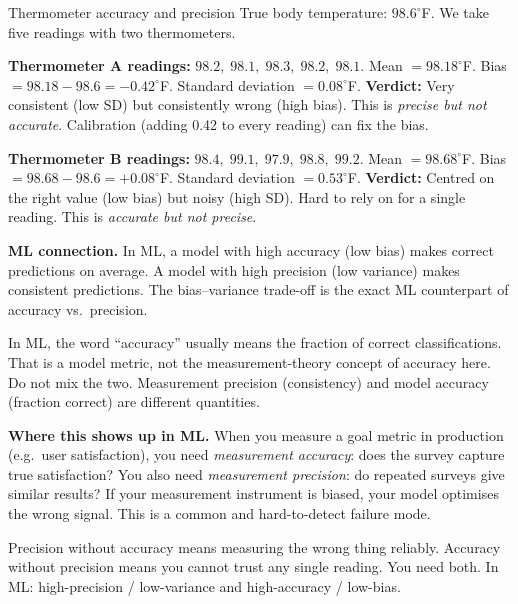 \documentclass[a4paper,11pt]{article}
\begin{document}
\begin{worked}{Thermometer accuracy and precision}
True body temperature: $98.6^{\circ}$F.
We take five readings with two thermometers.
\begin{steps}
  \item \textbf{Thermometer A readings:} $98.2,\; 98.1,\; 98.3,\; 98.2,\; 98.1$.
        Mean $= 98.18^{\circ}$F. Bias $= 98.18 - 98.6 = -0.42^{\circ}$F.
        Standard deviation $= 0.08^{\circ}$F.
        \textbf{Verdict:} Very consistent (low SD) but consistently wrong (high bias).
        This is \emph{precise but not accurate}.
        Calibration (adding 0.42 to every reading) can fix the bias.
  \item \textbf{Thermometer B readings:} $98.4,\; 99.1,\; 97.9,\; 98.8,\; 99.2$.
        Mean $= 98.68^{\circ}$F. Bias $= 98.68 - 98.6 = +0.08^{\circ}$F.
        Standard deviation $= 0.53^{\circ}$F.
        \textbf{Verdict:} Centred on the right value (low bias) but noisy (high SD).
        Hard to rely on for a single reading.
        This is \emph{accurate but not precise}.
  \item \textbf{ML connection.}
        In ML, a model with high accuracy (low bias) makes correct predictions
        on average.
        A model with high precision (low variance) makes consistent predictions.
        The bias--variance trade-off is the exact ML counterpart
        of accuracy vs.\ precision.
\end{steps}
\end{worked}

\begin{watchout}
In ML, the word ``accuracy'' usually means the fraction of correct classifications.
That is a model metric, not the measurement-theory concept of accuracy here.
Do not mix the two.
Measurement precision (consistency) and model accuracy (fraction correct)
are different quantities.
\end{watchout}

\noindent\textbf{Where this shows up in ML.}
When you measure a goal metric in production (e.g.\ user satisfaction),
you need \emph{measurement accuracy}: does the survey capture true satisfaction?
You also need \emph{measurement precision}: do repeated surveys give similar results?
If your measurement instrument is biased, your model optimises the wrong signal.
This is a common and hard-to-detect failure mode.

\begin{keytake}
Precision without accuracy means measuring the wrong thing reliably.
Accuracy without precision means you cannot trust any single reading.
You need both. In ML: high-precision / low-variance and
high-accuracy / low-bias.
\end{keytake}
\end{document}
